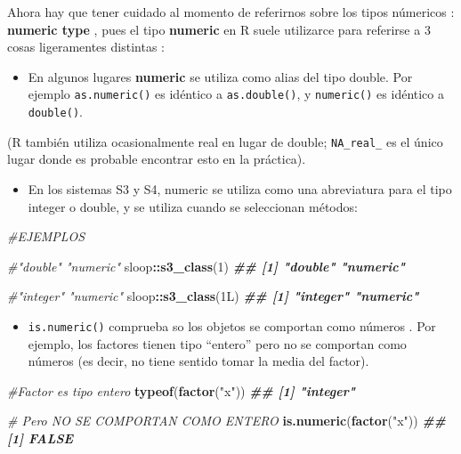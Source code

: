 \documentclass[
]{book}
\newenvironment{Shaded}{\begin{snugshade}}{\end{snugshade}}
\newcommand{\CommentTok}[1]{\textcolor[rgb]{0.56,0.35,0.01}{\textit{#1}}}
\newcommand{\DecValTok}[1]{\textcolor[rgb]{0.00,0.00,0.81}{#1}}
\newcommand{\DocumentationTok}[1]{\textcolor[rgb]{0.56,0.35,0.01}{\textbf{\textit{#1}}}}
\newcommand{\FunctionTok}[1]{\textcolor[rgb]{0.13,0.29,0.53}{\textbf{#1}}}
\newcommand{\NormalTok}[1]{#1}
\newcommand{\SpecialCharTok}[1]{\textcolor[rgb]{0.81,0.36,0.00}{\textbf{#1}}}
\newcommand{\StringTok}[1]{\textcolor[rgb]{0.31,0.60,0.02}{#1}}
\providecommand{\tightlist}{%
  \setlength{\itemsep}{0pt}\setlength{\parskip}{0pt}}
\begin{document}
Ahora hay que tener cuidado al momento de referirnos sobre los tipos númericos : \textbf{numeric type} , pues el tipo \textbf{numeric} en R suele utilizarce para referirse a 3 cosas ligeramentes distintas :

\begin{itemize}
\tightlist
\item
  En algunos lugares \textbf{numeric} se utiliza como alias del tipo double. Por ejemplo \texttt{as.numeric()} es idéntico a \texttt{as.double()}, y \texttt{numeric()} es idéntico a \texttt{double()}.
\end{itemize}

(R también utiliza ocasionalmente real en lugar de double; \texttt{NA\_real\_} es el único lugar donde es probable encontrar esto en la práctica).

\begin{itemize}
\tightlist
\item
  En los sistemas S3 y S4, numeric se utiliza como una abreviatura para el tipo integer o double, y se utiliza cuando se seleccionan métodos:
\end{itemize}

\begin{Shaded}
\begin{Highlighting}[]

\CommentTok{\#EJEMPLOS}

\CommentTok{\#"double" "numeric"}
\NormalTok{sloop}\SpecialCharTok{::}\FunctionTok{s3\_class}\NormalTok{(}\DecValTok{1}\NormalTok{)}
\DocumentationTok{\#\# [1] "double"  "numeric"}

\CommentTok{\#"integer" "numeric"}
\NormalTok{sloop}\SpecialCharTok{::}\FunctionTok{s3\_class}\NormalTok{(1L)}
\DocumentationTok{\#\# [1] "integer" "numeric"}
\end{Highlighting}
\end{Shaded}

\begin{itemize}
\tightlist
\item
  \texttt{is.numeric()} comprueba so los objetos se comportan como números . Por ejemplo, los factores tienen tipo ``entero'' pero no se comportan como números (es decir, no tiene sentido tomar la media del factor).
\end{itemize}

\begin{Shaded}
\begin{Highlighting}[]

\CommentTok{\#Factor es tipo entero }
\FunctionTok{typeof}\NormalTok{(}\FunctionTok{factor}\NormalTok{(}\StringTok{"x"}\NormalTok{))}
\DocumentationTok{\#\# [1] "integer"}


\CommentTok{\# Pero NO SE COMPORTAN COMO ENTERO }
\FunctionTok{is.numeric}\NormalTok{(}\FunctionTok{factor}\NormalTok{(}\StringTok{"x"}\NormalTok{))}
\DocumentationTok{\#\# [1] FALSE}
\end{Highlighting}
\end{Shaded}
\end{document}
